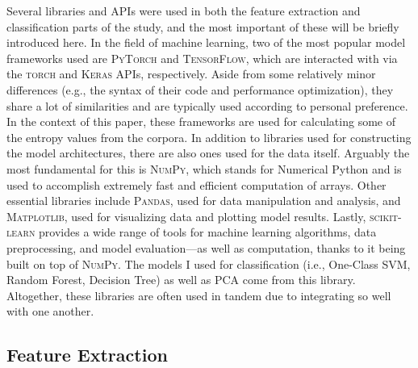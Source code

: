 \documentclass[12pt,a4paper]{article}
\numberwithin{figure}{section}
\numberwithin{table}{section}
\numberwithin{definition}{section}
\begin{document}
Several libraries and APIs were used in both the feature extraction and classification parts of the study, and the most important of these will be briefly introduced here. In the field of machine learning, two of the most popular model frameworks used are \textsc{PyTorch} and \textsc{TensorFlow}, which are interacted with via the \textsc{torch} and \textsc{Keras} APIs, respectively. Aside from some relatively minor differences (e.g., the syntax of their code and performance optimization), they share a lot of similarities and are typically used according to personal preference. In the context of this paper, these frameworks are used for calculating some of the entropy values from the corpora. In addition to libraries used for constructing the model architectures, there are also ones used for the data itself. Arguably the most fundamental for this is \textsc{NumPy}, which stands for Numerical Python and is used to accomplish extremely fast and efficient computation of arrays. Other essential libraries include \textsc{Pandas}, used for data manipulation and analysis, and \textsc{Matplotlib}, used for visualizing data and plotting model results. Lastly, \textsc{scikit-learn} provides a wide range of tools for machine learning algorithms, data preprocessing, and model evaluation---as well as computation, thanks to it being built on top of \textsc{NumPy}. The models I used for classification (i.e., One-Class SVM, Random Forest, Decision Tree) as well as PCA come from this library. Altogether, these libraries are often used in tandem due to integrating so well with one another. 

\subsection{Feature Extraction}
\label{ssec:featureextraction}


\end{document}
